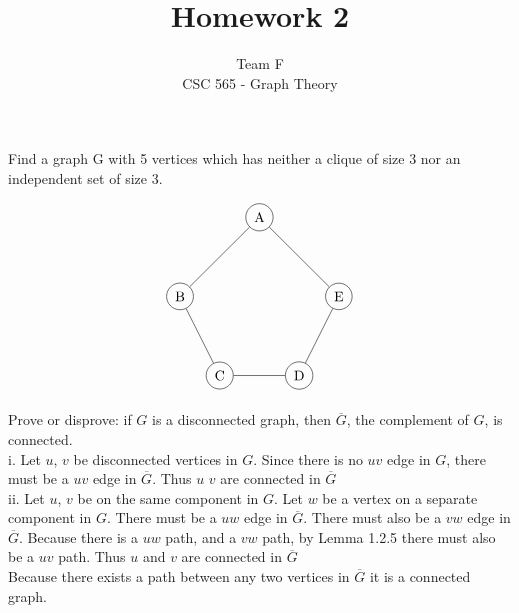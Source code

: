 \documentclass[12pt]{article}
\newenvironment{question}[2][Question]{\begin{trivlist}
\item[\hskip \labelsep {\bfseries #1}\hskip \labelsep {\bfseries #2.}]}{\end{trivlist}}
\begin{document}
 
 
 
\title{Homework 2}%
\author{Team F\\ %
CSC 565 - Graph Theory} %
 
\maketitle
 
\begin{question}{1}
Find a graph G with 5 vertices which has neither a clique of size 3 nor an independent set of size 3.
\end{question}

\begin{align*}
\begin{tikzpicture}
    \node[shape=circle,draw=black] (C) at (1,0) {C};
    \node[shape=circle,draw=black] (B) at (0,2) {B};
    \node[shape=circle,draw=black] (A) at (2,4) {A};
    \node[shape=circle,draw=black] (D) at (3,0) {D};
    \node[shape=circle,draw=black] (E) at (4,2) {E};
    \path [] (A) edge node[left] {} (B);
    \path [] (B) edge node[left] {} (C);
    \path [] (C) edge node[left] {} (D);
    \path [] (D) edge node[left] {} (E);
    \path [] (E) edge node[left] {} (A);
\end{tikzpicture}
\end{align*}


\begin{question}{5}
	Prove or disprove: if $G$ is a disconnected graph, then $\overline{G}$, the complement of $G$, is connected.\\	
	
	i. Let $u$, $v$ be disconnected vertices in $G$. Since there is no $uv$ edge in $G$, there must be a $uv$ edge in $\overline{G}$. Thus $u$ $v$ are connected in $\overline{G}$\\
		
	ii. Let $u$, $v$ be on the same component in $G$. Let $w$ be a vertex on a separate component in $G$. There must be a $uw$ edge in $\overline{G}$. There must also be a $vw$ edge in $\overline{G}$. 
	Because there is a $uw$ path, and a $vw$ path, by Lemma 1.2.5 there must also be a $uv$ path. Thus $u$ and $v$ are connected in $\overline{G}$\\
	
	Because there exists a path between any two vertices in $\overline{G}$ it is a connected graph.
\end{question}
\end{document}
